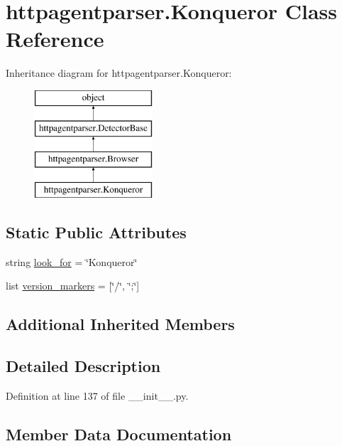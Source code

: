 \hypertarget{classhttpagentparser_1_1_konqueror}{}\section{httpagentparser.\+Konqueror Class Reference}
\label{classhttpagentparser_1_1_konqueror}
Inheritance diagram for httpagentparser.\+Konqueror\+:\begin{figure}[H]
\begin{center}
\leavevmode
\includegraphics[height=4.000000cm]{classhttpagentparser_1_1_konqueror}
\end{center}
\end{figure}
\subsection*{Static Public Attributes}
\begin{DoxyCompactItemize}
\item 
string \hyperlink{classhttpagentparser_1_1_konqueror_aec0d740aa4f7087356d0697d2014ba67}{look\+\_\+for} = \char`\"{}Konqueror\char`\"{}
\item 
list \hyperlink{classhttpagentparser_1_1_konqueror_ab4f1d229662963bcc4a00a674d3a9fe7}{version\+\_\+markers} = \mbox{[}\char`\"{}/\char`\"{}, \char`\"{};\char`\"{}\mbox{]}
\end{DoxyCompactItemize}
\subsection*{Additional Inherited Members}


\subsection{Detailed Description}


Definition at line 137 of file \+\_\+\+\_\+init\+\_\+\+\_\+.\+py.



\subsection{Member Data Documentation}
\hypertarget{classhttpagentparser_1_1_konqueror_aec0d740aa4f7087356d0697d2014ba67}{}\label{classhttpagentparser_1_1_konqueror_aec0d740aa4f7087356d0697d2014ba67} 

